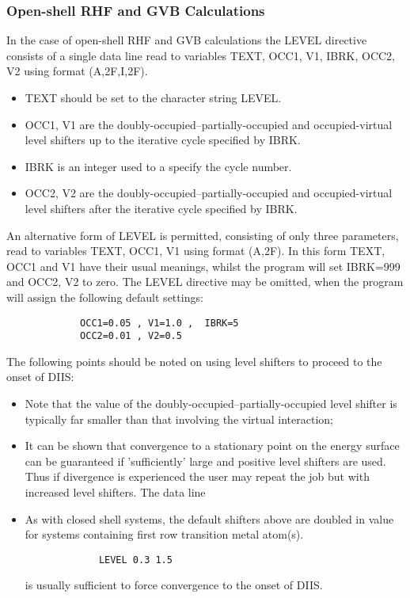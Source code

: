 \documentclass[11pt,fleqn]{article}
\begin{document}
\subsubsection{Open-shell RHF  and GVB Calculations}

In the case of open-shell RHF and GVB calculations the LEVEL directive
consists of a single  data line read to 
variables TEXT, OCC1, V1, IBRK, OCC2, V2
using format (A,2F,I,2F).
\begin{itemize}
\item TEXT should be set to the character string LEVEL.
\item  OCC1, V1 are the  doubly-occupied--partially-occupied 
and occupied-virtual
level shifters up to the iterative cycle specified by IBRK.
\item  IBRK is an integer used to a specify the cycle number.
\item  OCC2, V2 are the  doubly-occupied--partially-occupied 
and occupied-virtual
level shifters after the iterative cycle specified by IBRK.
\end{itemize}
An alternative form of LEVEL is permitted, consisting of only three
parameters, read to variables TEXT, OCC1, V1 using 
format (A,2F). In this form
TEXT, OCC1 and V1 have their usual meanings, whilst the program will set
IBRK=999 and OCC2, V2 to zero.
The LEVEL directive may be omitted, when the program will assign the
following default settings:

{
\footnotesize
\begin{verbatim}
             OCC1=0.05 , V1=1.0 ,  IBRK=5
             OCC2=0.01 , V2=0.5 
\end{verbatim}
}
The following points should be noted on using level shifters
to proceed to the onset of DIIS:
\begin{itemize}
\item Note that the value of the doubly-occupied--partially-occupied
level shifter is typically far smaller than that involving the
virtual interaction;
\item It can be shown that convergence to a stationary point on the
energy surface can be guaranteed if 'sufficiently' large and
positive level shifters are used. Thus if divergence is experienced
the user may repeat the job but with increased level shifters. The
data line
\item As with closed shell systems, the default shifters above
are doubled in value for systems containing first row transition
metal atom(s).

{
\footnotesize
\begin{verbatim}
             LEVEL 0.3 1.5
\end{verbatim}
}
is usually sufficient to force convergence to the onset of DIIS.
\end{itemize}
\end{document}
